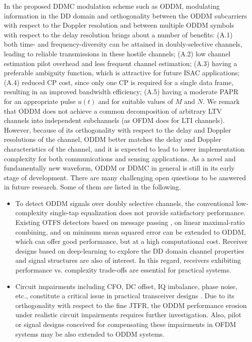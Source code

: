 \documentclass[journal]{IEEEtran}
\begin{document}
{In the proposed DDMC modulation scheme such as ODDM, modulating information in the DD domain and orthogonality between the ODDM subcarriers with respect to the Doppler resolution and between multiple ODDM symbols with respect to the delay resolution brings about a number of benefits: (A.1) both time- and frequency-diversity can be attained in doubly-selective channels, leading to reliable transmissions in these hostile channels; (A.2) low channel estimation pilot overhead and less frequent channel estimation; (A.3) having a preferable ambiguity function, which is attractive for future ISAC applications; (A.4) reduced CP cost, since only one CP is required for a single data frame, resulting in an improved bandwidth efficiency; (A.5) having a moderate PAPR for an appropriate pulse $u(t)$ and for suitable values of $M$ and $N$. 
{We remark that ODDM does not achieve a common decomposition of arbitrary LTV channels into independent subchannels (as OFDM does for LTI channels). However, because of its orthogonality with respect to the delay and Doppler resolutions of the channel, ODDM better matches the delay and Doppler characteristics of the channel, and it is expected to lead to lower implementation complexity for both communications and sensing applications.}
As a novel and fundamentally new waveform, ODDM or DDMC in general is still in its early stage of development. There are many challenging open questions to be answered in future research. Some of them are listed in the following.

\begin{itemize}
  \item To detect ODDM signals over doubly selective channels, the conventional low-complexity single-tap equalization does not provide satisfactory performance. {Existing OTFS detectors based on message passing \cite{viterbo_twc_2018,ampotfs}, on linear maximal-ratio combining\cite{thaj2020low}, and on minimum mean squared error\cite{mmse_otfs} can be extended to ODDM\cite{oddm_detector}, which can offer good performance, but at a high computational cost.} Receiver designs based on deep-learning to explore the DD domain channel properties and signal structures are also of interest. In this regard, receivers exhibiting performance vs. complexity trade-offs are essential for practical systems.

\item {Circuit impairments including CFO, DC offset, IQ imbalance, phase noise, etc., constitute a critical issue in practical transceiver designs \cite{rfme}. Due to its orthogonality with respect to the fine JTFR, the ODDM performance erosion under realistic circuit impairments requires further investigation. Also, pilot or signal designs conceived for compensating these impairments in OFDM systems\cite{ofdm_cfo_dc,ofdm_cfo_iq_blind,ofdm_cfo_iq} may be also extended to ODDM systems. }


\end{itemize}}
\end{document}
